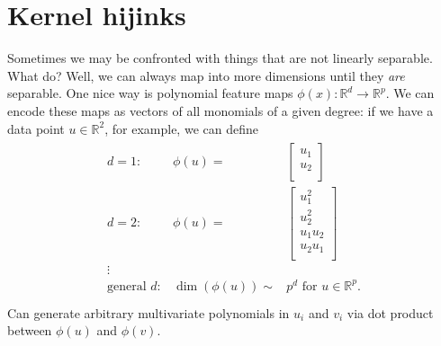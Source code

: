 \documentclass[11pt,letterpaper]{article}
\theoremstyle{definition}
\theoremstyle{plain}
\numberwithin{equation}{section}
\numberwithin{figure}{section}
\begin{document}
\section{Kernel hijinks}
Sometimes we may be confronted with things that are not linearly separable. What do? Well, we can always map into more dimensions until they \emph{are} separable. One nice way is polynomial feature maps $\phi(x) : \mathbb{R}^d \to \mathbb{R}^p$. We can encode these maps as vectors of all monomials of a given degree: if we have a data point $u \in \mathbb{R}^2$, for example, we can define
%
\begin{align}
	\begin{array}{lrr}
	d = 1:& \phi(u) =& \begin{bmatrix}u_1\\u_2\\\end{bmatrix}\\
	d = 2:& \phi(u) =& \begin{bmatrix}u_1^2\\u_2^2\\u_1u_2\\u_2u_1\\\end{bmatrix}\\
	\vdots &&\\
	\text{general }d :& \dim(\phi(u)) \sim& p^d \text{ for } u\in \mathbb{R}^p.\\
	\end{array}
\end{align}
%
Can generate arbitrary multivariate polynomials in $u_i$ and $v_i$ via dot product between $\phi(u)$ and $\phi(v)$.
\end{document}
